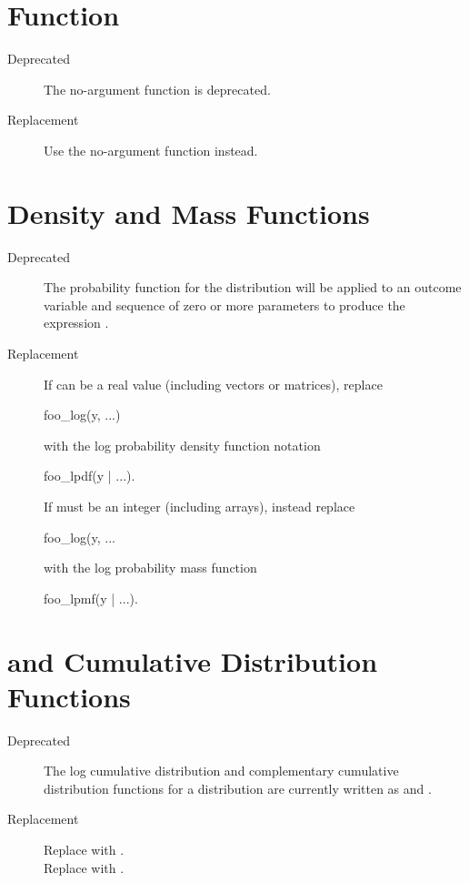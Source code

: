 \section{ Function}

\begin{description}
\item[Deprecated]
The no-argument function  is deprecated.
\item[Replacement]
Use the no-argument function  instead.
\end{description}

\section{ Density and Mass Functions}

\begin{description}
\item[Deprecated] The probability function for the distribution
   will be applied to an outcome variable  and
  sequence of zero or more parameters  to produce the
  expression .
\item[Replacement] If  can be a real value (including vectors
or matrices), replace
%
\begin{stancode}
foo_log(y, ...)
\end{stancode}
%
with the log probability density function notation
%
\begin{stancode}
foo_lpdf(y | ...).
\end{stancode}
%
If  must be an integer (including arrays),
instead replace
%
\begin{stancode}
foo_log(y, ...
\end{stancode}
%
with the log probability mass function
%
\begin{stancode}
foo_lpmf(y | ...).
\end{stancode}
\end{description}

\section{ and  Cumulative Distribution
  Functions}

\begin{description}
\item[Deprecated]
The log cumulative distribution and complementary cumulative
distribution functions for a distribution  are currently
written as  and .
\item[Replacement]
Replace  with .
\\[4pt]
Replace  with .
\end{description}

